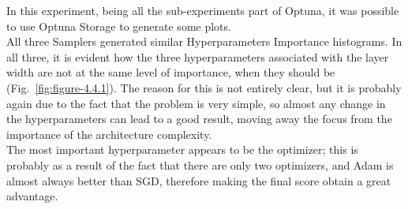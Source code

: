 In this experiment, being all the sub-experiments part of Optuna, it was possible to use Optuna Storage to generate some plots.
\\[0.3cm]All three Samplers generated similar Hyperparameters Importance histograms. In all three, it is evident how the three hyperparameters associated with the layer width are not at the same level of importance, when they should be (Fig.~\ref{fig:figure-4.4.1}). The reason for this is not entirely clear, but it is probably again due to the fact that the problem is very simple, so almost any change in the hyperparameters can lead to a good result, moving away the focus from the importance of the architecture complexity.
\\[0.3cm]The most important hyperparameter appears to be the optimizer; this is probably as a result of the fact that there are only two optimizers, and Adam is almost always better than SGD, therefore making the final score obtain a great advantage.
